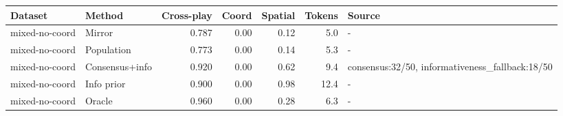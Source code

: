 \begin{tabular}{llrrrrl}
\toprule
Dataset & Method & Cross-play & Coord & Spatial & Tokens & Source \\
\midrule
mixed-no-coord & Mirror & 0.787 & 0.00 & 0.12 & 5.0 & - \\
mixed-no-coord & Population & 0.773 & 0.00 & 0.14 & 5.3 & - \\
mixed-no-coord & Consensus+info & 0.920 & 0.00 & 0.62 & 9.4 & consensus:32/50, informativeness\_fallback:18/50 \\
mixed-no-coord & Info prior & 0.900 & 0.00 & 0.98 & 12.4 & - \\
mixed-no-coord & Oracle & 0.960 & 0.00 & 0.28 & 6.3 & - \\
\bottomrule
\end{tabular}
